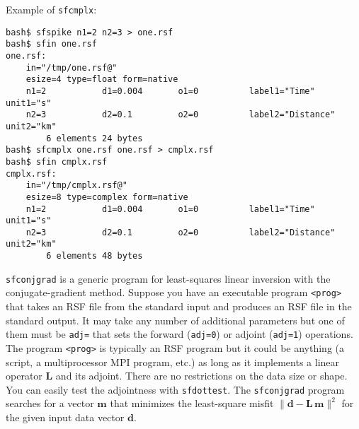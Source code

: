 Example of \texttt{sfcmplx}:
\begin{verbatim}
bash$ sfspike n1=2 n2=3 > one.rsf
bash$ sfin one.rsf
one.rsf:
    in="/tmp/one.rsf@"
    esize=4 type=float form=native
    n1=2           d1=0.004       o1=0          label1="Time" unit1="s"
    n2=3           d2=0.1         o2=0          label2="Distance" unit2="km"
        6 elements 24 bytes
bash$ sfcmplx one.rsf one.rsf > cmplx.rsf
bash$ sfin cmplx.rsf
cmplx.rsf:
    in="/tmp/cmplx.rsf@"
    esize=8 type=complex form=native
    n1=2           d1=0.004       o1=0          label1="Time" unit1="s"
    n2=3           d2=0.1         o2=0          label2="Distance" unit2="km"
        6 elements 48 bytes
\end{verbatim}

\noindent\doublebox{\parbox{\textwidth}{
    
}}

\texttt{sfconjgrad} is a generic program for least-squares linear
inversion with the conjugate-gradient method. Suppose you have an
executable program \texttt{<prog>} that takes an RSF file from the
standard input and produces an RSF file in the standard output. It may
take any number of additional parameters but one of them must be
\texttt{adj=} that sets the forward (\texttt{adj=0}) or adjoint
(\texttt{adj=1}) operations.  The program \texttt{<prog>} is typically
an RSF program but it could be anything (a script, a multiprocessor
MPI program, etc.) as long as it implements a linear operator
$\mathbf{L}$ and its adjoint. There are no restrictions on the data
size or shape. You can easily test the adjointness with
\texttt{sfdottest}. The \texttt{sfconjgrad} program searches for a
vector $\mathbf{m}$ that minimizes the least-square misfit 
$\|\mathbf{d - L\,m}\|^2$ for the given input data vector $\mathbf{d}$.

